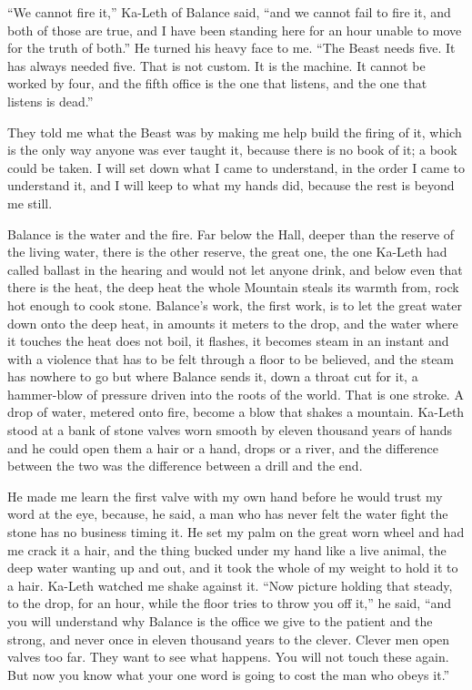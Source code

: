 ``We cannot fire it,'' Ka-Leth of Balance said, ``and we cannot fail to fire it, and both of those are true, and I have been standing here for an hour unable to move for the truth of both.'' He turned his heavy face to me. ``The Beast needs five. It has always needed five. That is not custom. It is the machine. It cannot be worked by four, and the fifth office is the one that listens, and the one that listens is dead.''\par

\ornament

They told me what the Beast was by making me help build the firing of it, which is the only way anyone was ever taught it, because there is no book of it; a book could be taken. I will set down what I came to understand, in the order I came to understand it, and I will keep to what my hands did, because the rest is beyond me still.\par

Balance is the water and the fire. Far below the Hall, deeper than the reserve of the living water, there is the other reserve, the great one, the one Ka-Leth had called ballast in the hearing and would not let anyone drink, and below even that there is the heat, the deep heat the whole Mountain steals its warmth from, rock hot enough to cook stone. Balance's work, the first work, is to let the great water down onto the deep heat, in amounts it meters to the drop, and the water where it touches the heat does not boil, it flashes, it becomes steam in an instant and with a violence that has to be felt through a floor to be believed, and the steam has nowhere to go but where Balance sends it, down a throat cut for it, a hammer-blow of pressure driven into the roots of the world. That is one stroke. A drop of water, metered onto fire, become a blow that shakes a mountain. Ka-Leth stood at a bank of stone valves worn smooth by eleven thousand years of hands and he could open them a hair or a hand, drops or a river, and the difference between the two was the difference between a drill and the end.\par

He made me learn the first valve with my own hand before he would trust my word at the eye, because, he said, a man who has never felt the water fight the stone has no business timing it. He set my palm on the great worn wheel and had me crack it a hair, and the thing bucked under my hand like a live animal, the deep water wanting up and out, and it took the whole of my weight to hold it to a hair. Ka-Leth watched me shake against it. ``Now picture holding that steady, to the drop, for an hour, while the floor tries to throw you off it,'' he said, ``and you will understand why Balance is the office we give to the patient and the strong, and never once in eleven thousand years to the clever. Clever men open valves too far. They want to see what happens. You will not touch these again. But now you know what your one word is going to cost the man who obeys it.''\par

